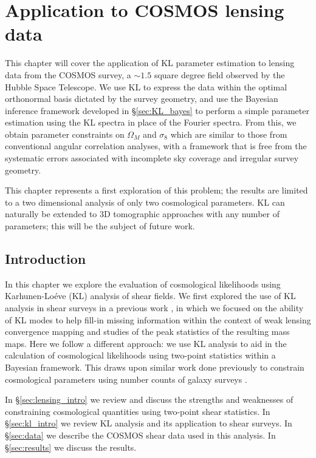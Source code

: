 \chapter{Application to COSMOS lensing data}

This chapter will cover the application of KL parameter estimation to
lensing data from the COSMOS survey, a $\sim 1.5$ square degree field
observed by the Hubble Space Telescope. We use KL to express the data
within the optimal orthonormal basis dictated by the 
survey geometry, and use the Bayesian inference framework developed in
\S\ref{sec:KL_bayes} to perform a simple parameter estimation using
the KL spectra in place of the Fourier spectra.  From this, we obtain
parameter constraints on $\Omega_M$ and $\sigma_8$ which are similar to
those from conventional angular correlation analyses, with a framework that
is free from the systematic errors associated with incomplete sky coverage
and irregular survey geometry.

This chapter represents a first exploration of this problem; the results are
limited to a two dimensional analysis of only two cosmological parameters.
KL can naturally be extended to 3D tomographic approaches with any number of
parameters; this will be the subject of future work.

\section{Introduction}
\label{sec:introduction}

In this chapter we explore the evaluation of cosmological
likelihoods using Karhunen-Lo\'{e}ve (KL) analysis of shear fields.  
We first explored the use of KL analysis in shear surveys in a previous work
\citep[Chapter 4;][]{Vanderplas2012}, in which we focused on the ability of
KL modes to help fill-in missing information within the context of weak
lensing convergence mapping and studies of the peak statistics of the
resulting mass maps.
Here we follow a different approach:
we use KL analysis to aid in the calculation of cosmological likelihoods
using two-point statistics within a Bayesian framework.
This draws upon similar work done
previously to constrain cosmological parameters using number counts of
galaxy surveys \citep{Vogeley96, Pope04}.

In \S\ref{sec:lensing_intro} we review and discuss the strengths and
weaknesses of constraining cosmological quantities using two-point shear
statistics.
In \S\ref{sec:kl_intro} we review KL analysis and its application to 
shear surveys.
In \S\ref{sec:data} we describe the COSMOS shear data used in this analysis.
In \S\ref{sec:results} we discuss the results.

